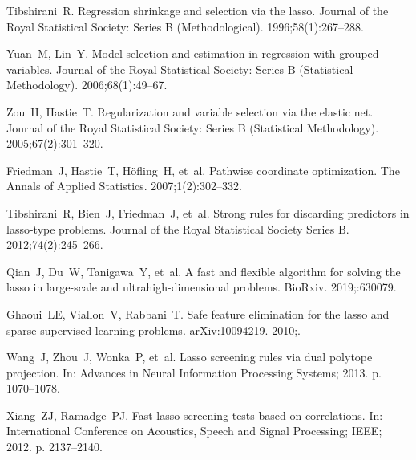 \documentclass[]{interact}
\theoremstyle{plain}%
\theoremstyle{definition}
\theoremstyle{remark}
\begin{document}
\renewcommand\bibname{References}

\begin{thebibliography}{10}
\providecommand{\url}[1]{\normalfont{#1}}
\providecommand{\urlprefix}{Available from: }

Tibshirani~R. Regression shrinkage and selection via the lasso. Journal of the
  Royal Statistical Society: Series B (Methodological).
  1996;\hspace{0pt}58(1):267--288.

Yuan~M, Lin~Y. Model selection and estimation in regression with grouped
  variables. Journal of the Royal Statistical Society: Series B (Statistical
  Methodology). 2006;\hspace{0pt}68(1):49--67.

Zou~H, Hastie~T. Regularization and variable selection via the elastic net.
  Journal of the Royal Statistical Society: Series B (Statistical Methodology).
  2005;\hspace{0pt}67(2):301--320.

Friedman~J, Hastie~T, H{\"o}fling~H, et~al. Pathwise coordinate optimization.
  The Annals of Applied Statistics. 2007;\hspace{0pt}1(2):302--332.

Tibshirani~R, Bien~J, Friedman~J, et~al. Strong rules for discarding predictors
  in lasso-type problems. Journal of the Royal Statistical Society Series B.
  2012;\hspace{0pt}74(2):245--266.

Qian~J, Du~W, Tanigawa~Y, et~al. A fast and flexible algorithm for solving the
  lasso in large-scale and ultrahigh-dimensional problems. BioRxiv.
  2019;\hspace{0pt}:630079.

Ghaoui~LE, Viallon~V, Rabbani~T. Safe feature elimination for the lasso and
  sparse supervised learning problems. arXiv:10094219. 2010;\hspace{0pt}.

Wang~J, Zhou~J, Wonka~P, et~al. Lasso screening rules via dual polytope
  projection. In: Advances in Neural Information Processing Systems; 2013. p.
  1070--1078.

Xiang~ZJ, Ramadge~PJ. Fast lasso screening tests based on correlations. In:
  International Conference on Acoustics, Speech and Signal Processing; IEEE;
  2012. p. 2137--2140.


\end{thebibliography}
\end{document}
